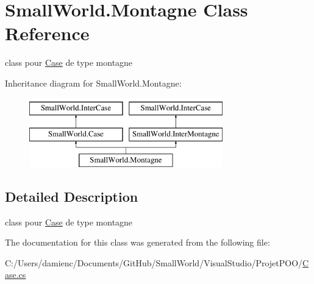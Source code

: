 \hypertarget{class_small_world_1_1_montagne}{\section{Small\-World.\-Montagne Class Reference}
\label{class_small_world_1_1_montagne}
}


class pour \hyperlink{class_small_world_1_1_case}{Case} de type montagne  


Inheritance diagram for Small\-World.\-Montagne\-:\begin{figure}[H]
\begin{center}
\leavevmode
\includegraphics[height=3.000000cm]{class_small_world_1_1_montagne}
\end{center}
\end{figure}


\subsection{Detailed Description}
class pour \hyperlink{class_small_world_1_1_case}{Case} de type montagne 

The documentation for this class was generated from the following file\-:\begin{DoxyCompactItemize}
\item 
C\-:/\-Users/damienc/\-Documents/\-Git\-Hub/\-Small\-World/\-Visual\-Studio/\-Projet\-P\-O\-O/\hyperlink{_case_8cs}{Case.\-cs}\end{DoxyCompactItemize}
